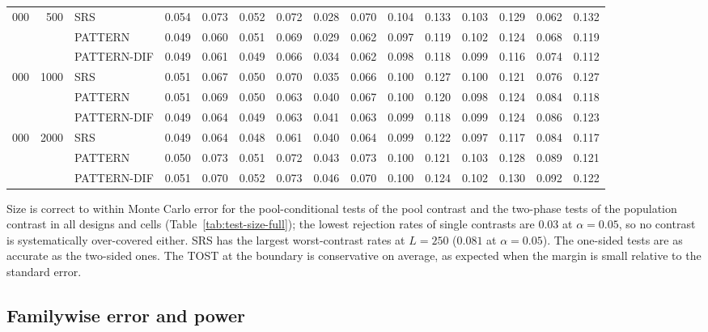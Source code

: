 \documentclass[pdflatex,sn-mathphys-num,iicol]{sn-jnl}
\theoremstyle{thmstyleone}
\theoremstyle{thmstyletwo}
\theoremstyle{thmstylethree}
\begin{document}
\begin{table}[t]
{\begin{tabular}{rrl rr rr rr rr rr rr }
\addlinespace
8{,}000 & 500 & SRS & 0.054 & 0.073 & 0.052 & 0.072 & 0.028 & 0.070 & 0.104 & 0.133 & 0.103 & 0.129 & 0.062 & 0.132 \\
 &  & PATTERN & 0.049 & 0.060 & 0.051 & 0.069 & 0.029 & 0.062 & 0.097 & 0.119 & 0.102 & 0.124 & 0.068 & 0.119 \\
 &  & PATTERN-DIF & 0.049 & 0.061 & 0.049 & 0.066 & 0.034 & 0.062 & 0.098 & 0.118 & 0.099 & 0.116 & 0.074 & 0.112 \\
\addlinespace
8{,}000 & 1000 & SRS & 0.051 & 0.067 & 0.050 & 0.070 & 0.035 & 0.066 & 0.100 & 0.127 & 0.100 & 0.121 & 0.076 & 0.127 \\
 &  & PATTERN & 0.051 & 0.069 & 0.050 & 0.063 & 0.040 & 0.067 & 0.100 & 0.120 & 0.098 & 0.124 & 0.084 & 0.118 \\
 &  & PATTERN-DIF & 0.049 & 0.064 & 0.049 & 0.063 & 0.041 & 0.063 & 0.099 & 0.118 & 0.099 & 0.124 & 0.086 & 0.123 \\
\addlinespace
8{,}000 & 2000 & SRS & 0.049 & 0.064 & 0.048 & 0.061 & 0.040 & 0.064 & 0.099 & 0.122 & 0.097 & 0.117 & 0.084 & 0.117 \\
 &  & PATTERN & 0.050 & 0.073 & 0.051 & 0.072 & 0.043 & 0.073 & 0.100 & 0.121 & 0.103 & 0.128 & 0.089 & 0.121 \\
 &  & PATTERN-DIF & 0.051 & 0.070 & 0.052 & 0.073 & 0.046 & 0.070 & 0.100 & 0.124 & 0.102 & 0.130 & 0.092 & 0.122 \\
\bottomrule\end{tabular}}

\end{table}

Size is correct to within Monte Carlo error for the pool-conditional tests of the pool contrast and the two-phase tests of the population contrast in all designs and cells (Table~\ref{tab:test-size-full}); the lowest rejection rates of single contrasts are $0.03$ at $\alpha=0.05$, so no contrast is systematically over-covered either. SRS has the largest worst-contrast rates at $L=250$ ($0.081$ at $\alpha=0.05$). The one-sided tests are as accurate as the two-sided ones. The TOST at the boundary is conservative on average, as expected when the margin is small relative to the standard error.

\subsection{Familywise error and power}
\end{document}

